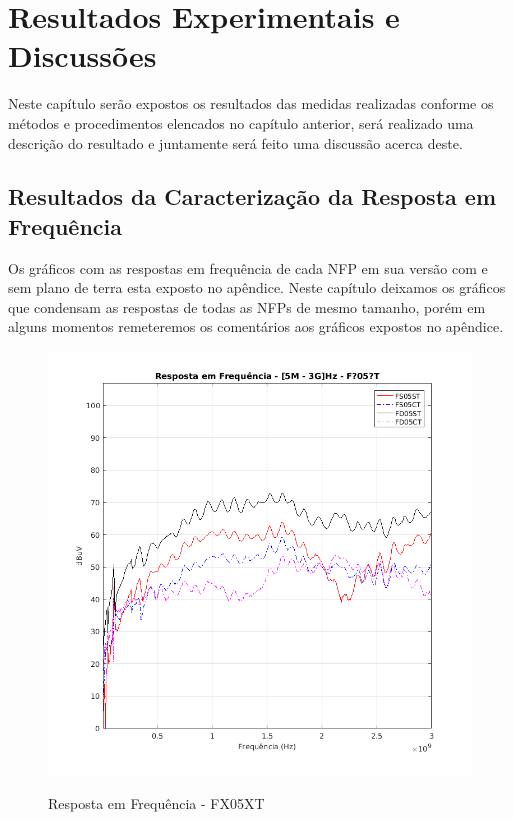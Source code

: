 \chapter{Resultados Experimentais e Discussões}
Neste capítulo serão expostos os resultados das medidas realizadas conforme os métodos e procedimentos elencados no capítulo anterior, será realizado uma descrição do resultado e juntamente será feito uma discussão acerca deste.

\section{Resultados da Caracterização da Resposta em Frequência}
Os gráficos com as respostas em frequência de cada NFP em sua versão com e sem plano de terra esta exposto no apêndice. Neste capítulo deixamos os gráficos que condensam as respostas de todas as NFPs de mesmo tamanho, porém em alguns momentos remeteremos os comentários aos gráficos expostos no apêndice.

\begin{figure}[htb!]
	\centering 
	\caption{Resposta em Frequência - FX05XT}
	\includegraphics[scale=0.7]{./img/FX05XT}
	\label{fig:FX05XT}
\end{figure}


